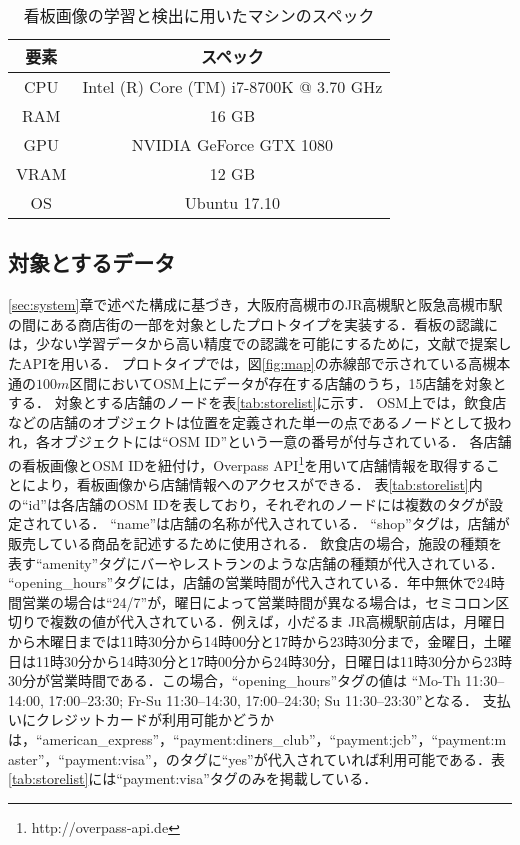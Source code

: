     \begin{table}[tb]
        \caption{看板画像の学習と検出に用いたマシンのスペック}
        \label{tab:machine}
        \begin{center}
        \begin{tabular}{c|c}
            \hline\hline
            要素 & スペック \\
            \hline
            CPU & Intel (R) Core (TM) i7-8700K @ 3.70 GHz \\
            RAM & 16 GB \\
            GPU & NVIDIA GeForce GTX 1080 \\
            VRAM & 12 GB \\
            OS & Ubuntu 17.10 \\
            \hline
        \end{tabular}
        \end{center}
    \end{table}

    \subsection{対象とするデータ}
    \ref{sec:system}章で述べた構成に基づき，大阪府高槻市のJR高槻駅と阪急高槻市駅の間にある商店街の一部を対象としたプロトタイプを実装する．看板の認識には，少ない学習データから高い精度での認識を可能にするために，文献\cite{Kitamura2018}で提案したAPIを用いる．
    プロトタイプでは，図\ref{fig:map}の赤線部で示されている高槻本通の$100 m$区間においてOSM上にデータが存在する店舗のうち，15店舗を対象とする．
    対象とする店舗のノードを表\ref{tab:storelist}に示す．
    OSM上では，飲食店などの店舗のオブジェクトは位置を定義された単一の点であるノードとして扱われ，各オブジェクトには``OSM ID''という一意の番号が付与されている．
    各店舗の看板画像とOSM IDを紐付け，Overpass API\footnote{http://overpass-api.de}を用いて店舗情報を取得することにより，看板画像から店舗情報へのアクセスができる．
    表\ref{tab:storelist}内の``id''は各店舗のOSM IDを表しており，それぞれのノードには複数のタグが設定されている．
    ``name''は店舗の名称が代入されている．
    ``shop''タグは，店舗が販売している商品を記述するために使用される．
    飲食店の場合，施設の種類を表す``amenity''タグにバーやレストランのような店舗の種類が代入されている．
    ``opening\_hours''タグには，店舗の営業時間が代入されている．年中無休で24時間営業の場合は``24/7''が，曜日によって営業時間が異なる場合は，セミコロン区切りで複数の値が代入されている．例えば，小だるま JR高槻駅前店は，月曜日から木曜日までは11時30分から14時00分と17時から23時30分まで，金曜日，土曜日は11時30分から14時30分と17時00分から24時30分，日曜日は11時30分から23時30分が営業時間である．この場合，``opening\_hours''タグの値は
    ``Mo-Th 11:30--14:00, 17:00--23:30; Fr-Su 11:30--14:30, 17:00--24:30; Su 11:30--23:30''となる．
    支払いにクレジットカードが利用可能かどうかは，``american\_express''，``payment:diners\_club''，``payment:jcb''，``payment:master''，``payment:visa''，のタグに``yes''が代入されていれば利用可能である．表\ref{tab:storelist}には``payment:visa''タグのみを掲載している．


